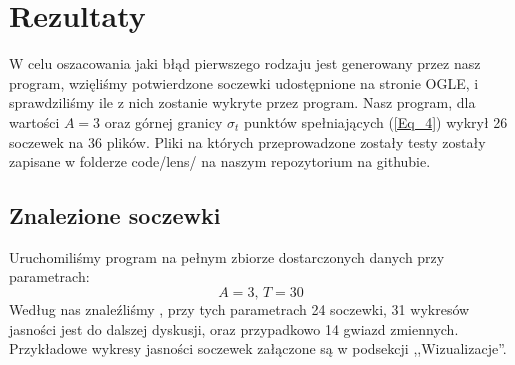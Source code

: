 \documentclass[a4paper,11pt]{article}
\newcommand{\ak}{\hspace{0.7 cm}}
\begin{document}
\section{Rezultaty}
		\ak W celu oszacowania jaki błąd pierwszego rodzaju jest generowany przez nasz program, wzięliśmy potwierdzone soczewki udostępnione na stronie OGLE, i sprawdziliśmy ile z nich zostanie wykryte przez program. Nasz program, dla wartości $A = 3$ oraz górnej granicy $\sigma_t$ punktów spełniających (\ref{Eq_4}) wykrył 26 soczewek na 36 plików. Pliki na których przeprowadzone zostały testy zostały zapisane w folderze code/lens/ na naszym repozytorium na githubie.
\subsection{Znalezione soczewki}
\ak Uruchomiliśmy program na pełnym zbiorze dostarczonych danych przy parametrach: 
$$A=3\textrm{, } T=30$$
\ak Według nas znaleźliśmy , przy tych parametrach 24 soczewki, 31 wykresów jasności jest do dalszej dyskusji, oraz przypadkowo 14 gwiazd zmiennych. Przykładowe wykresy jasności soczewek załączone są w podsekcji ,,Wizualizacje''. 
\end{document}
